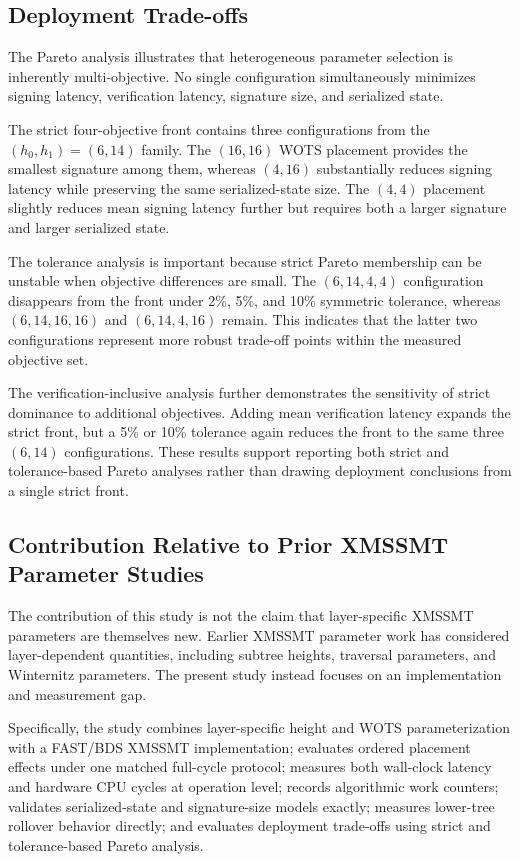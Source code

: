 \documentclass[pdflatex,sn-mathphys-num]{sn-jnl}
\begin{document}
\subsection{Deployment Trade-offs}
\label{sec:discussion_deployment}

The Pareto analysis illustrates that heterogeneous parameter selection
is inherently multi-objective. No single configuration simultaneously
minimizes signing latency, verification latency, signature size, and
serialized state.

The strict four-objective front contains three configurations from the
$(h_0,h_1)=(6,14)$ family. The $(16,16)$ WOTS placement provides the
smallest signature among them, whereas $(4,16)$ substantially reduces
signing latency while preserving the same serialized-state size.
The $(4,4)$ placement slightly reduces mean signing latency further but
requires both a larger signature and larger serialized state.

The tolerance analysis is important because strict Pareto membership can
be unstable when objective differences are small. The
$(6,14,4,4)$ configuration disappears from the front under 2\%,
5\%, and 10\% symmetric tolerance, whereas $(6,14,16,16)$ and
$(6,14,4,16)$ remain. This indicates that the latter two configurations
represent more robust trade-off points within the measured objective
set.

The verification-inclusive analysis further demonstrates the sensitivity
of strict dominance to additional objectives. Adding mean verification
latency expands the strict front, but a 5\% or 10\% tolerance again
reduces the front to the same three $(6,14)$ configurations. These
results support reporting both strict and tolerance-based Pareto
analyses rather than drawing deployment conclusions from a single
strict front.

\subsection{Contribution Relative to Prior XMSSMT Parameter Studies}
\label{sec:discussion_novelty}

The contribution of this study is not the claim that layer-specific
XMSSMT parameters are themselves new. Earlier XMSSMT parameter work has
considered layer-dependent quantities, including subtree heights,
traversal parameters, and Winternitz parameters. The present study
instead focuses on an implementation and measurement gap.

Specifically, the study combines layer-specific height and WOTS
parameterization with a FAST/BDS XMSSMT implementation; evaluates
ordered placement effects under one matched full-cycle protocol;
measures both wall-clock latency and hardware CPU cycles at operation
level; records algorithmic work counters; validates serialized-state
and signature-size models exactly; measures lower-tree rollover
behavior directly; and evaluates deployment trade-offs using strict
and tolerance-based Pareto analysis.
\end{document}
